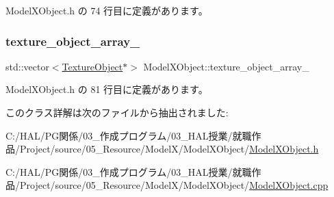  Model\+X\+Object.\+h の 74 行目に定義があります。

\mbox{\label{class_model_x_object_ab0af78894e6aa05a0aecb3174eafe26b}} 
\subsubsection{\texorpdfstring{texture\+\_\+object\+\_\+array\+\_\+}{texture\_object\_array\_}}
{\footnotesize\ttfamily std\+::vector$<$\mbox{\hyperlink{class_texture_object}{Texture\+Object}}$\ast$$>$ Model\+X\+Object\+::texture\+\_\+object\+\_\+array\+\_\+\hspace{0.3cm}{\ttfamily [private]}}



 Model\+X\+Object.\+h の 81 行目に定義があります。



このクラス詳解は次のファイルから抽出されました\+:\begin{DoxyCompactItemize}
\item 
C\+:/\+H\+A\+L/\+P\+G関係/03\+\_\+作成プログラム/03\+\_\+\+H\+A\+L授業/就職作品/\+Project/source/05\+\_\+\+Resource/\+Model\+X/\+Model\+X\+Object/\mbox{\hyperlink{_model_x_object_8h}{Model\+X\+Object.\+h}}\item 
C\+:/\+H\+A\+L/\+P\+G関係/03\+\_\+作成プログラム/03\+\_\+\+H\+A\+L授業/就職作品/\+Project/source/05\+\_\+\+Resource/\+Model\+X/\+Model\+X\+Object/\mbox{\hyperlink{_model_x_object_8cpp}{Model\+X\+Object.\+cpp}}\end{DoxyCompactItemize}
